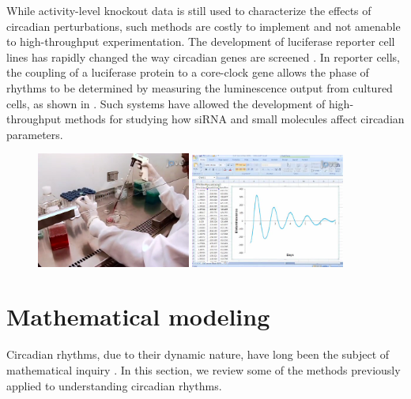 While activity-level knockout data is still used to characterize the effects of circadian perturbations, such methods are costly to implement and not amenable to high-throughput experimentation.
The development of luciferase reporter cell lines has rapidly changed the way circadian genes are screened \cite{Yoo2004}.
In reporter cells, the coupling of a luciferase protein to a core-clock gene allows the phase of rhythms to be determined by measuring the luminescence output from cultured cells, as shown in .
Such systems have allowed the development of high-throughput methods for studying how siRNA \cite{Zhang2009} and small molecules \cite{Hirota2008} affect circadian parameters.

\begin{figure}[tbp]
  \centering
  \includegraphics[width=0.45\textwidth]{chap1/figures/cells.png}
  \includegraphics[width=0.45\textwidth]{chap1/figures/data.png}
  \label{fig:chidalumin}
\end{figure}

\section{Mathematical modeling}

Circadian rhythms, due to their dynamic nature, have long been the subject of mathematical inquiry \cite{Winfree2001}. In this section, we review some of the methods previously applied to understanding circadian rhythms.


